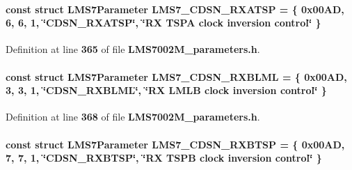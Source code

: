 \paragraph[{L\+M\+S7\+\_\+\+C\+D\+S\+N\+\_\+\+R\+X\+A\+T\+SP}]{\setlength{\rightskip}{0pt plus 5cm}const struct {\bf L\+M\+S7\+Parameter} L\+M\+S7\+\_\+\+C\+D\+S\+N\+\_\+\+R\+X\+A\+T\+SP = \{ 0x00\+A\+D, 6, 6, 1, \char`\"{}\+C\+D\+S\+N\+\_\+\+R\+X\+A\+T\+S\+P\char`\"{}, \char`\"{}\+R\+X T\+S\+P\+A clock inversion control\char`\"{} \}\hspace{0.3cm}{\ttfamily [static]}}\label{LMS7002M__parameters_8h_a7e51eb16215064810ca1ba8e3cfaaadf}


Definition at line {\bf 365} of file {\bf L\+M\+S7002\+M\+\_\+parameters.\+h}.

\paragraph[{L\+M\+S7\+\_\+\+C\+D\+S\+N\+\_\+\+R\+X\+B\+L\+ML}]{\setlength{\rightskip}{0pt plus 5cm}const struct {\bf L\+M\+S7\+Parameter} L\+M\+S7\+\_\+\+C\+D\+S\+N\+\_\+\+R\+X\+B\+L\+ML = \{ 0x00\+A\+D, 3, 3, 1, \char`\"{}\+C\+D\+S\+N\+\_\+\+R\+X\+B\+L\+M\+L\char`\"{}, \char`\"{}\+R\+X L\+M\+L\+B clock inversion control\char`\"{} \}\hspace{0.3cm}{\ttfamily [static]}}\label{LMS7002M__parameters_8h_a5c69d70fe6be5f98baa2981403927d3d}


Definition at line {\bf 368} of file {\bf L\+M\+S7002\+M\+\_\+parameters.\+h}.

\paragraph[{L\+M\+S7\+\_\+\+C\+D\+S\+N\+\_\+\+R\+X\+B\+T\+SP}]{\setlength{\rightskip}{0pt plus 5cm}const struct {\bf L\+M\+S7\+Parameter} L\+M\+S7\+\_\+\+C\+D\+S\+N\+\_\+\+R\+X\+B\+T\+SP = \{ 0x00\+A\+D, 7, 7, 1, \char`\"{}\+C\+D\+S\+N\+\_\+\+R\+X\+B\+T\+S\+P\char`\"{}, \char`\"{}\+R\+X T\+S\+P\+B clock inversion control\char`\"{} \}\hspace{0.3cm}{\ttfamily [static]}}\label{LMS7002M__parameters_8h_aac5e072613b1cda835220975ab1e9928}


